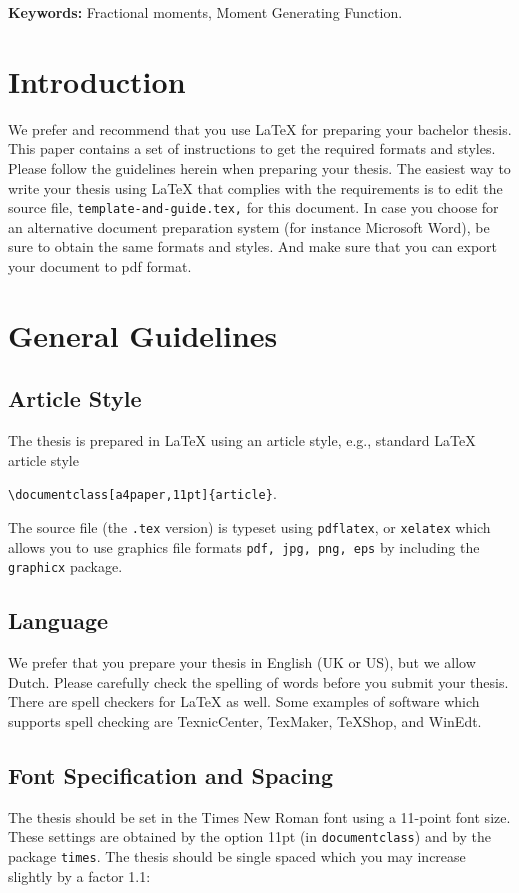 \documentclass[a4paper,11pt]{article}
\theoremstyle{plain}
\theoremstyle{definition}
\begin{document}
\bigskip\noindent
\textbf{Keywords:} Fractional moments, Moment Generating Function.

\section{Introduction}\label{s:intro}
We prefer and recommend that you use LaTeX for preparing your
bachelor thesis.
This paper contains a set of instructions to get the required formats and styles.
Please follow the guidelines herein when preparing your thesis.
The easiest way to write your thesis using LaTeX that complies with the
requirements is to edit the source file, \texttt{template-and-guide.tex,}
for this document. In case you choose for an alternative document preparation system
(for instance Microsoft Word), be sure to obtain the same formats and styles.
And make sure that you can export your document to pdf format.

\section{General Guidelines}\label{s:general}
\subsection{Article Style}
The thesis is prepared in LaTeX using an article style, e.g., standard
LaTeX article style

\verb+\documentclass[a4paper,11pt]{article}+.

\noindent
The source file (the \texttt{.tex} version) is typeset using \texttt{pdflatex},
or \texttt{xelatex} which allows you to use graphics file formats 
\texttt{pdf, jpg, png, eps}
by including the \texttt{graphicx} package.

\subsection{Language}
We prefer that you prepare your thesis in English (UK or US), but we allow Dutch.
Please carefully check the spelling of words before you submit your thesis.
There are spell checkers for LaTeX as well.
Some examples of software which supports spell checking are
TexnicCenter, TexMaker, TeXShop, and WinEdt.

\subsection{Font Specification and Spacing}
The thesis should be set in the Times New Roman font using a 11-point font size.
These settings are obtained by the option 11pt (in \texttt{documentclass})
and by the package \texttt{times}.
The thesis should be single spaced which you may increase slightly by a factor 1.1:
\end{document}
